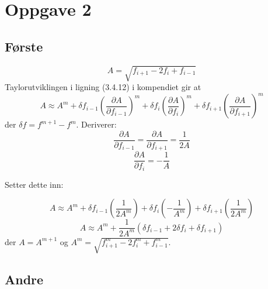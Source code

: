 


\section*{Oppgave 2} %
\label{sec:oppgave_2}

\subsection*{Første} %
\label{sub:f_rste}


\begin{equation}
  A = \sqrt{f_{i+1} - 2f_i + f_{i-1}}
\end{equation}
Taylorutviklingen i ligning (3.4.12) i kompendiet gir at
\begin{equation}
  A \approx A^m
  + \delta f_{i-1} \left( \frac{\partial A}{\partial f_{i-1}} \right)^m
  + \delta f_{i} \left( \frac{\partial A}{\partial f_{i}} \right)^m
  + \delta f_{i+1} \left( \frac{\partial A}{\partial f_{i+1}} \right)^m
\end{equation}
der $\delta f = f^{m+1} - f^m$. Deriverer:
\begin{equation}
  \frac{\partial A}{\partial f_{i-1}} = \frac{\partial A}{\partial f_{i+1}} = \frac{1}{2A}
\end{equation}
\begin{equation}
  \frac{\partial A}{\partial f_i} = - \frac{1}{A}
\end{equation}

Setter dette inn:

\begin{equation*}
  A \approx A^m
  + \delta f_{i-1} \left( \frac{1}{2A^m} \right)
  + \delta f_{i} \left( - \frac{1}{A^m} \right)
  + \delta f_{i+1} \left( \frac{1}{2A^m} \right)
\end{equation*}
\begin{equation}
  A \approx A^m + \frac{1}{2A^m} \left( \delta f_{i-1} + 2 \delta f_{i} + \delta f_{i+1} \right)
\end{equation}
der $A = A^{m+1}$ og $A^m = \sqrt{f_{i+1}^m - 2f_{i}^m + f_{i-1}^m}$.



\subsection*{Andre} %
\label{sub:andre}

